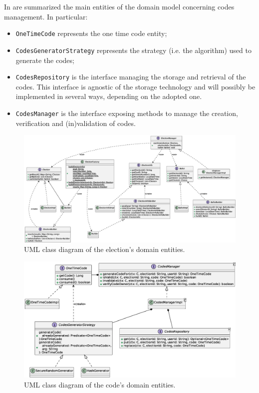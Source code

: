 \documentclass{scrartcl}
\begin{document}
In  are summarized the main entities of the domain model concerning codes management.
%
In particular:
%
\begin{itemize}
    \item \texttt{OneTimeCode} represents the one time code entity;
    \item \texttt{CodesGeneratorStrategy} represents the strategy (i.e. the algorithm) used to generate the codes;
    \item \texttt{CodesRepository} is the interface managing the storage and retrieval of the codes. This interface is agnostic of the storage technology and will possibly be implemented in several ways, depending on the adopted one.
    \item \texttt{CodesManager} is the interface exposing methods to manage the creation, verification and (in)validation of codes. 
\end{itemize}

\begin{landscape}
    \begin{figure}
        \centering
        \includegraphics[width=\linewidth]{figures/election-design.eps}
        \caption{UML class diagram of the election's domain entities.}
        \label{fig:election-design} 
    \end{figure}
\end{landscape}

\begin{figure}
    \centering
    \includegraphics[width=\linewidth]{figures/codes-design.eps}
    \caption{UML class diagram of the code's domain entities.}
    \label{fig:codes-design} 
\end{figure}
\end{document}

